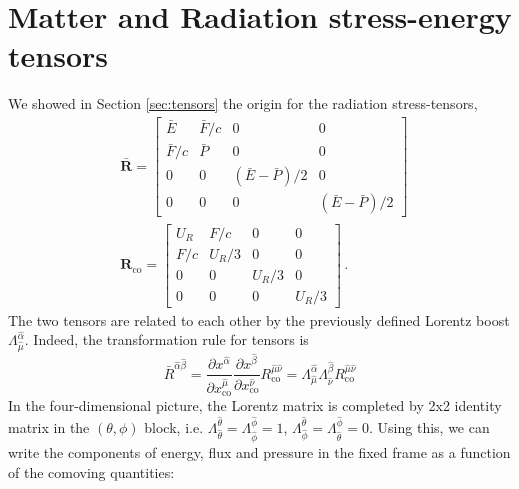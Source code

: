 \documentclass[../main.tex]{subfiles}
\begin{document}
\section*{Matter and Radiation stress-energy tensors}
We showed in Section \ref{sec:tensors} the origin for the radiation stress-tensors,
\begin{align}
&\bm{\bar{R}}=\begin{bmatrix}\bar{E} & \bar{F}/c &0&0\\\bar{F}/c &\bar{P} &0&0\\0&0&(\bar{E}-\bar{P})/2&0\\0&0&0&(\bar{E}-\bar{P})/2\end{bmatrix}\,\\
&\bm{R}_\text{co}=\begin{bmatrix}U_R & F/c&0&0\\F/c&U_R/3&0&0\\0&0&U_R/3&0\\0&0&0&U_R/3\end{bmatrix}\,.
\end{align}
The two tensors are related to each other by the previously defined Lorentz boost $\Lambda^{\hat{\alpha}}_{\hat{\mu}}$. Indeed, the transformation rule for tensors is 
\begin{equation}
      \bar{R}^{\hat{\alpha}\hat{\beta}}=\frac{\partial x^{\hat{\alpha}}}{\partial x^{\hat{\mu}}_\text{co}}\frac{\partial x^{\hat{\beta}}}{\partial x^{\hat{\nu}}_\text{co}}R^{\hat{\mu}\hat{\nu}}_\text{co}=\Lambda^{\hat{\alpha}}_{\hat{\mu}}\Lambda^{\hat{\beta}}_{\hat{\nu}}R^{\hat{\mu}\hat{\nu}}_\text{co}
\end{equation}
In the four-dimensional picture, the Lorentz matrix is completed by 2x2 identity matrix in the $(\theta,\phi)$ block, i.e. $\Lambda^{\hat{\theta}}_{\hat{\theta}}=\Lambda^{\hat{\phi}}_{\hat{\phi}}=1$, $\Lambda^{\hat{\theta}}_{\hat{\phi}}=\Lambda^{\hat{\phi}}_{\hat{\theta}}=0$.  Using this, we can write the components of energy, flux and pressure in the fixed frame as a function of the comoving quantities:
\begingroup
\allowdisplaybreaks
\end{document}
